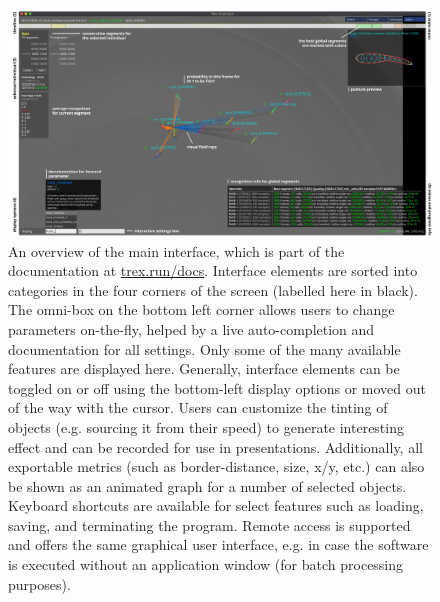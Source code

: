 \documentclass[9pt,lineno]{elife}
\newcommand{\TRex}{\protect\path{TRex}}
\begin{document}
\begin{figure}
\begin{fullwidth}
\includegraphics[width=1.0\linewidth]{trex_screenshot.pdf}
\caption{An overview of \TRex{'} the main interface, which is part of the documentation at \href{https://trex.run/docs}{trex.run/docs}. Interface elements are sorted into categories in the four corners of the screen (labelled here in black). The omni-box on the bottom left corner allows users to change parameters on-the-fly, helped by a live auto-completion and documentation for all settings. Only some of the many available features are displayed here. Generally, interface elements can be toggled on or off using the bottom-left display options or moved out of the way with the cursor. Users can customize the tinting of objects (e.g. sourcing it from their speed) to generate interesting effect and can be recorded for use in presentations. Additionally, all exportable metrics (such as border-distance, size, x/y, etc.) can also be shown as an animated graph for a number of selected objects. Keyboard shortcuts are available for select features such as loading, saving, and terminating the program. Remote access is supported and offers the same graphical user interface, e.g. in case the software is executed without an application window (for batch processing purposes).}
\label{fig:trex_screenshot}
\end{fullwidth}
\end{figure}
\end{document}
